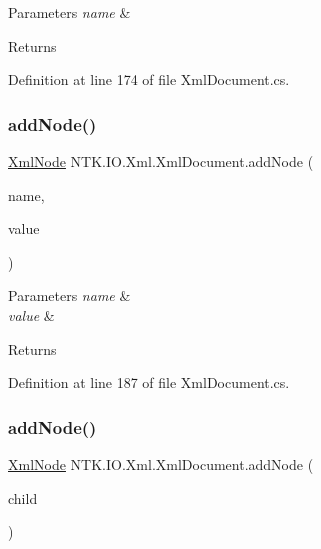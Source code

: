 \begin{DoxyParams}{Parameters}
{\em name} & \\
\hline
\end{DoxyParams}
\begin{DoxyReturn}{Returns}

\end{DoxyReturn}


Definition at line 174 of file Xml\+Document.\+cs.

\mbox{\label{class_n_t_k_1_1_i_o_1_1_xml_1_1_xml_document_a78213bc10fa71ceb814f2d3b6db4fa1c}} 
\subsubsection{\texorpdfstring{addNode()}{addNode()}\hspace{0.1cm}{\footnotesize\ttfamily [2/3]}}
{\footnotesize\ttfamily \mbox{\hyperlink{class_n_t_k_1_1_i_o_1_1_xml_1_1_xml_node}{Xml\+Node}} N\+T\+K.\+I\+O.\+Xml.\+Xml\+Document.\+add\+Node (\begin{DoxyParamCaption}\item[{String}]{name,  }\item[{String}]{value }\end{DoxyParamCaption})}






\begin{DoxyParams}{Parameters}
{\em name} & \\
\hline
{\em value} & \\
\hline
\end{DoxyParams}
\begin{DoxyReturn}{Returns}

\end{DoxyReturn}


Definition at line 187 of file Xml\+Document.\+cs.

\mbox{\label{class_n_t_k_1_1_i_o_1_1_xml_1_1_xml_document_a595999ed34085d2dbf514dea6dcc61aa}} 
\subsubsection{\texorpdfstring{addNode()}{addNode()}\hspace{0.1cm}{\footnotesize\ttfamily [3/3]}}
{\footnotesize\ttfamily \mbox{\hyperlink{class_n_t_k_1_1_i_o_1_1_xml_1_1_xml_node}{Xml\+Node}} N\+T\+K.\+I\+O.\+Xml.\+Xml\+Document.\+add\+Node (\begin{DoxyParamCaption}\item[{\mbox{\hyperlink{class_n_t_k_1_1_i_o_1_1_xml_1_1_xml_node}{Xml\+Node}}}]{child }\end{DoxyParamCaption})}






